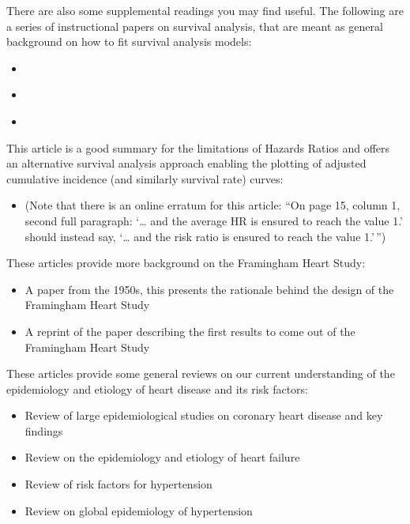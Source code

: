 \documentclass[
]{book}
\providecommand{\tightlist}{%
  \setlength{\itemsep}{0pt}\setlength{\parskip}{0pt}}
\begin{document}
There are also some supplemental readings you may find useful. The following are a series of instructional papers on survival analysis, that are
meant as general background on how to fit survival analysis models:

\begin{itemize}
\item
  \citet{clark2003survival}
\item
  \citet{bradburn2003survival}
\item
  \citet{bradburn2003survival2}
\end{itemize}

This article is a good summary for the limitations of Hazards Ratios and offers an alternative survival analysis approach enabling the plotting of adjusted cumulative incidence (and similarly survival rate) curves:

\begin{itemize}
\tightlist
\item
  \citet{hernan2010hazards} (Note that there is an online erratum for this article: ``On page 15, column 1, second full paragraph: `\ldots{} and the average HR is ensured to reach the value 1.' should instead say, `\ldots{} and the risk ratio is ensured to reach the value 1.'\,'')
\end{itemize}

These articles provide more background on the Framingham Heart Study:

\begin{itemize}
\tightlist
\item
  \citet{dawber1951epidemiological} A paper from the 1950s, this presents the rationale behind the design of the Framingham Heart Study
\item
  \citet{dawber2015ii} A reprint of the paper describing the first results to come out of the Framingham Heart Study
\end{itemize}

These articles provide some general reviews on our current understanding of the epidemiology and etiology of heart disease and its risk factors:

\begin{itemize}
\tightlist
\item
  \citet{wong2014epidemiological} Review of large epidemiological studies on coronary heart disease and key findings
\item
  \citet{ziaeian2016epidemiology} Review on the epidemiology and etiology of heart failure
\item
  \citet{valenzuela2021lifestyle} Review of risk factors for hypertension
\item
  \citet{zhou2021global} Review on global epidemiology of hypertension
\end{itemize}
\end{document}
